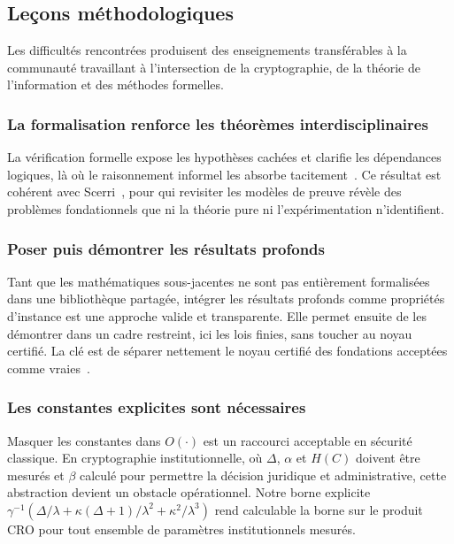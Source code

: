 \subsection{Le\c{c}ons m\'ethodologiques}
\label{subsec:lecons_methodologiques}
\begin{sloppypar}
Les difficult\'es rencontr\'ees produisent des enseignements
transf\'erables \`a la communaut\'e travaillant \`a l'intersection de
la cryptographie, de la th\'eorie de l'information et des m\'ethodes
formelles.

\subsubsection{La formalisation renforce les th\'eor\`emes interdisciplinaires}
\label{subsubsec:formalisation_renforce}

La v\'erification formelle expose les hypoth\`eses cach\'ees et clarifie
les d\'ependances logiques, l\`a o\`u le raisonnement informel les
absorbe tacitement~\cite{Wiedijk2008,Avigad2014}. Ce r\'esultat est
coh\'erent avec Scerri~\cite{Scerri14}, pour qui revisiter les mod\`eles de
preuve r\'ev\`ele des probl\`emes fondationnels que ni la th\'eorie pure
ni l'exp\'erimentation n'identifient.

\subsubsection{Poser puis d\'emontrer les r\'esultats profonds}
\label{subsubsec:axiomatisation_pragmatique}

Tant que les math\'ematiques sous-jacentes ne sont pas enti\`erement
formalis\'ees dans une biblioth\`eque partag\'ee, int\'egrer les
r\'esultats profonds comme propri\'et\'es d'instance est une approche
valide et transparente. Elle permet ensuite de les d\'emontrer dans un cadre
restreint, ici les lois finies, sans toucher au noyau certifi\'e. La cl\'e est de s\'eparer nettement le noyau
certifi\'e des fondations accept\'ees comme
vraies~\cite{BartheEA2013}.

\subsubsection{Les constantes explicites sont n\'ecessaires}
\label{subsubsec:constantes_explicites}

Masquer les constantes dans $O(\cdot)$ est un raccourci acceptable en
s\'ecurit\'e classique. En cryptographie institutionnelle, o\`u
$\Delta$, $\alpha$ et $H(C)$ doivent \^etre mesur\'es et $\beta$ calcul\'e pour
permettre la d\'ecision juridique et administrative, cette abstraction
devient un obstacle op\'erationnel. Notre borne explicite
$\gamma^{-1}(\Delta/\lambda + \kappa(\Delta+1)/\lambda^2 +
\kappa^2/\lambda^3)$ rend calculable la borne sur le produit CRO pour
tout ensemble de param\`etres institutionnels mesur\'es.


\end{sloppypar}
